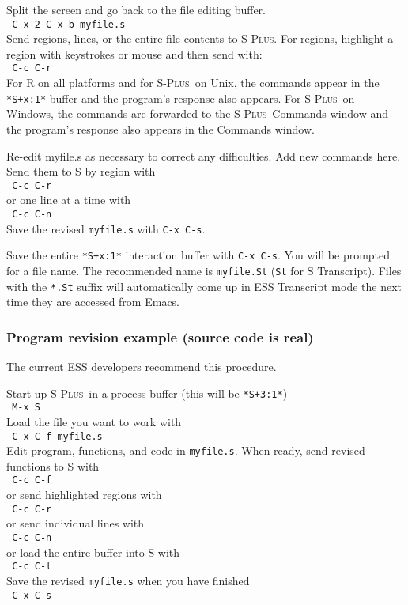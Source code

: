 \documentclass{article}
\newcommand*{\Splus}{\textsc{S-Plus}}
\newcommand{\stexttt}[1]{{\small\texttt{#1}}}
\newcommand{\elcode}[1]{\\{\stexttt{\hspace*{2em} #1}}\\}
\begin{document}
Split the screen and go back to the file editing buffer.
  \elcode{C-x 2 C-x b myfile.s}
Send regions, lines, or the entire file contents to \Splus.
For regions, highlight a region with keystrokes or mouse
and then send with:
  \elcode{C-c C-r}
For R on all platforms and for \Splus\ on Unix, the commands appear in
the \stexttt{*S+x:1*} buffer and the program's response also appears.
For \Splus\ on Windows, the commands are forwarded to the \Splus\ Commands
window and the program's response also appears in the Commands window.

Re-edit myfile.s as necessary to correct any difficulties.  Add
new commands here.  Send them to S by region with
  \elcode{C-c C-r}
or one line at a time with
  \elcode{C-c C-n}
Save the revised \stexttt{myfile.s} with \stexttt{C-x C-s}.

Save the entire \stexttt{*S+x:1*} interaction buffer with \stexttt{C-x C-s}.
You will be prompted for a file name.  The recommended name is
\stexttt{myfile.St} (\stexttt{St} for S Transcript).
Files with the \stexttt{*.St} suffix will automatically come up in ESS
Transcript mode the next time they are accessed from Emacs.


\subsubsection{Program revision example (source code is real)}
The current ESS developers recommend this procedure.

\noindent
Start up \Splus\ in a process buffer (this will be \stexttt{*S+3:1*})
  \elcode{M-x S}
Load the file you want to work with
  \elcode{C-x C-f myfile.s}
Edit program, functions, and code in \stexttt{myfile.s}.
When ready, send revised functions to S with
  \elcode{C-c C-f}
or send highlighted regions with
  \elcode{C-c C-r}
or send individual lines with
  \elcode{C-c C-n}
or load the entire buffer into S with
  \elcode{C-c C-l}
Save the revised \stexttt{myfile.s} when you have finished
  \elcode{C-x C-s}


\end{document}
